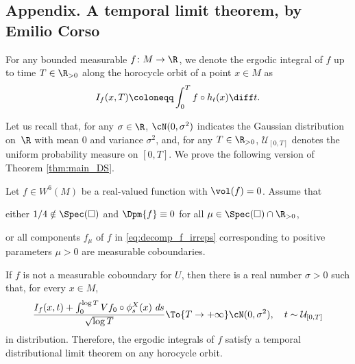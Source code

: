 \begin{appendix}
\let\oldthefootnote\thefootnote
\renewcommand{\thefootnote}{*}
\section*{Appendix. A temporal limit theorem, by Emilio Corso\texorpdfstring{\protect\footnotemark}{fn}}

\setcounter{footnote}{0}
\let\thefootnote\oldthefootnote

For any bounded measurable $f\colon M\to \R$, we denote the ergodic integral of $f$ up to time $T\in \R_{>0}$ along the horocycle orbit of a point $x\in M$ as
\begin{equation*}
I_f(x,T)\coloneqq\int_0^{T}f\circ h_t(x)\diff t.
\end{equation*}

Let us recall that, for any $\sigma\in \R$, $\cN(0,\sigma^{2})$ indicates the Gaussian distribution on~$\R$ with mean $0$ and variance $\sigma^{2}$, and, for any $T\in \R_{>0}$, $\mathcal{U}_{[0,T]}$ denotes the uniform probability measure on $[0,T]$.
We prove the following version of Theorem \ref{thm:main_DS}.

\begin{theorem}
\label{temporalDLT}
Let $f \in W^6(M)$ be a real-valued function with $\vol(f)=0$.
Assume that
\begin{enumeratea}
\item\label{temporalDLTa}
either $1/4 \notin \Spec(\square)$ and $\Dpm{f} \equiv 0$ for all $\mu \in \Spec(\square) \cap \R_{>0}$,
\item\label{temporalDLTb}
or all components $f_\mu$ of $f$ in \eqref{eq:decomp_f_irreps} corresponding to positive parameters $\mu >0$ are measurable coboundaries.
\end{enumeratea}
If $f$ is not a measurable coboundary for $U$, then there is a real number $\sigma>0$ such that, for every $x \in M$,
\begin{equation}
\label{distrlimit}
\frac{I_f(x,t)+\int_0^{\log{T}}Vf_0\circ\phi^{X}_s(x)\;\emph{d}s}{\sqrt{\log{T}}}\To{T\to+\infty}\cN(0,\sigma^{2}), \quad t\sim \mathcal{U}_{[0,T]}
\end{equation}
in distribution. Therefore, the ergodic integrals of $f$ satisfy a temporal distributional limit theorem on any horocycle orbit.
\end{theorem}


\end{appendix}
